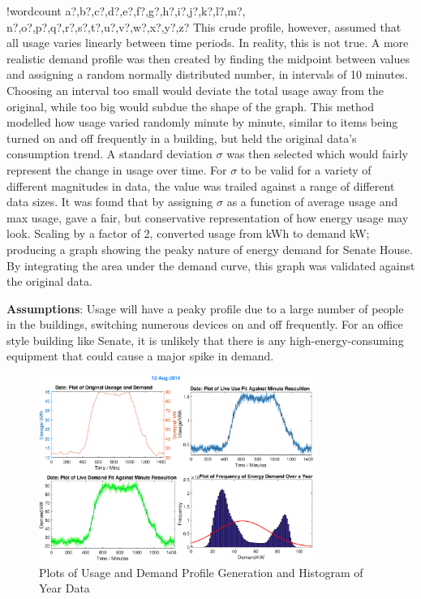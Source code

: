 \documentclass[fontsize=9.5pt]{extarticle}
\numberwithin{figure}{section} %
\newcounter{words}
\newenvironment{counted}{%
  \setcounter{words}{0}
  \SearchList!{wordcount}{\stepcounter{words}}
    {a?,b?,c?,d?,e?,f?,g?,h?,i?,j?,k?,l?,m?,
    n?,o?,p?,q?,r?,s?,t?,u?,v?,w?,x?,y?,z?}
  \UndoBoundary{'}
  \SearchOrder{p;}}{%
  \StopSearching}
\begin{document}
\begin{counted}
This crude profile, however, assumed that all usage varies linearly
between time periods. In reality, this is not true. A more realistic
demand profile was then created by finding the midpoint between values
and assigning a random normally distributed number, in intervals of 10
minutes. Choosing an interval too small would deviate the total usage
away from the original, while too big would subdue the shape of the
graph. This method modelled how usage varied randomly minute by minute,
similar to items being turned on and off frequently in a building, but
held the original data's consumption trend. A standard deviation
\(\sigma\) was then selected which would fairly represent the change in
usage over time. For \(\sigma\) to be valid for a variety of different
magnitudes in data, the value was trailed against a range of different
data sizes. It was found that by assigning \(\sigma\) as a function of
average usage and max usage, gave a fair, but conservative
representation of how energy usage may look. Scaling by a factor of 2,
converted usage from kWh to demand kW; producing a graph showing the
peaky nature of energy demand for Senate House. By integrating the area
under the demand curve, this graph was validated against the original
data.

\textbf{Assumptions}: Usage will have a peaky profile due to a large
number of people in the buildings, switching numerous devices on and off
frequently. For an office style building like Senate, it is unlikely
that there is any high-energy-consuming equipment that could cause a
major spike in demand.

\begin{figure}[H]
 \centering
   \vspace{-5pt}
 \includegraphics[trim = 0 0 0 0 clip, width=0.8\textwidth]{sendem.eps}
  \vspace{-10pt}
 \caption{Plots of Usage and Demand Profile Generation and Histogram of Year Data}
 \label{sendem}
 \vspace{-25pt}
 \end{figure}


\end{counted}
\end{document}
